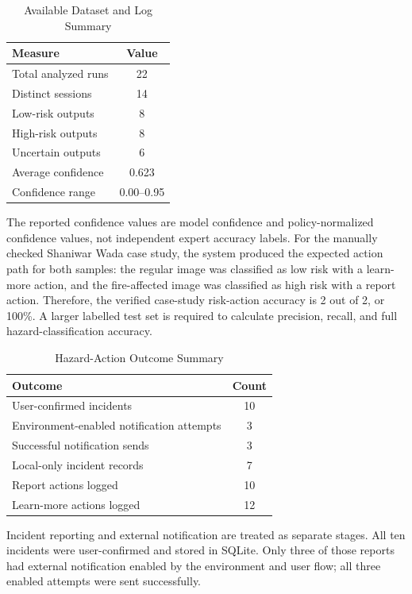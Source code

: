 \begin{table}[H]
\centering
\caption{Available Dataset and Log Summary}
\begin{tabular}{|l|c|}
\hline
\textbf{Measure} & \textbf{Value} \\ \hline
Total analyzed runs & 22 \\ \hline
Distinct sessions & 14 \\ \hline
Low-risk outputs & 8 \\ \hline
High-risk outputs & 8 \\ \hline
Uncertain outputs & 6 \\ \hline
Average confidence & 0.623 \\ \hline
Confidence range & 0.00--0.95 \\ \hline
\end{tabular}
\end{table}

The reported confidence values are model confidence and policy-normalized confidence values, not independent expert accuracy labels. For the manually checked Shaniwar Wada case study, the system produced the expected action path for both samples: the regular image was classified as low risk with a learn-more action, and the fire-affected image was classified as high risk with a report action. Therefore, the verified case-study risk-action accuracy is 2 out of 2, or 100\%. A larger labelled test set is required to calculate precision, recall, and full hazard-classification accuracy.

\begin{table}[H]
\centering
\caption{Hazard-Action Outcome Summary}
\begin{tabular}{|l|c|}
\hline
\textbf{Outcome} & \textbf{Count} \\ \hline
User-confirmed incidents & 10 \\ \hline
Environment-enabled notification attempts & 3 \\ \hline
Successful notification sends & 3 \\ \hline
Local-only incident records & 7 \\ \hline
Report actions logged & 10 \\ \hline
Learn-more actions logged & 12 \\ \hline
\end{tabular}
\end{table}

Incident reporting and external notification are treated as separate stages. All ten incidents were user-confirmed and stored in SQLite. Only three of those reports had external notification enabled by the environment and user flow; all three enabled attempts were sent successfully.

